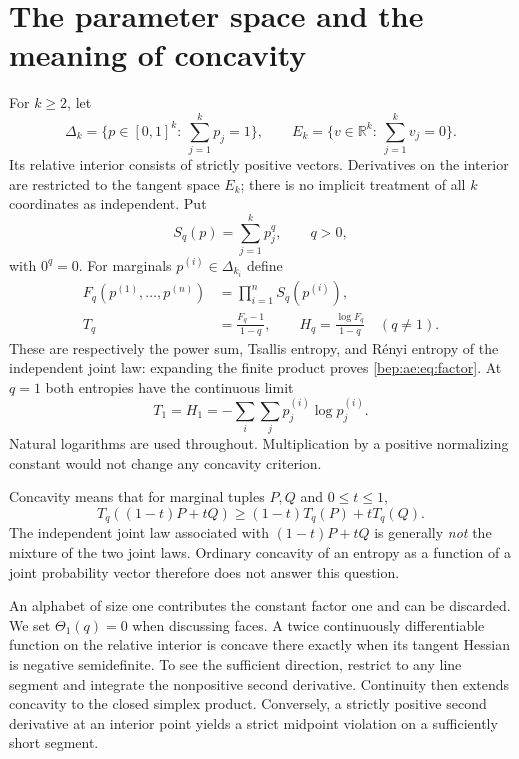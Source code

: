 \documentclass[11pt]{article}
\numberwithin{equation}{section}
\theoremstyle{definition}
\theoremstyle{remark}
\newcommand{\R}{\mathbb R}
\begin{document}
\section{The parameter space and the meaning of concavity}\label{bep:ae:sec:setup}
For $k\geq2$, let
\[
 \Delta_k=\{p\in[0,1]^k:\ \sum_{j=1}^k p_j=1\},\qquad
 E_k=\{v\in\R^k:\ \sum_{j=1}^k v_j=0\}.
\]
Its relative interior consists of strictly positive vectors. Derivatives
on the interior are restricted to the tangent space $E_k$; there is no
implicit treatment of all $k$ coordinates as independent. Put
\begin{equation}\label{bep:ae:eq:powersums}
 S_q(p)=\sum_{j=1}^k p_j^q,\qquad q>0,
\end{equation}
with $0^q=0$. For marginals $p^{(i)}\in\Delta_{k_i}$ define
\begin{align}
 F_q(p^{(1)},\ldots,p^{(n)})&=\prod_{i=1}^n S_q(p^{(i)}),\label{bep:ae:eq:factor}\\
 T_q&=\frac{F_q-1}{1-q},\qquad
 H_q=\frac{\log F_q}{1-q}\quad(q\ne1).\label{bep:ae:eq:entropies}
\end{align}
These are respectively the power sum, Tsallis entropy, and R\'enyi entropy
of the independent joint law: expanding the finite product proves
\eqref{bep:ae:eq:factor}. At $q=1$ both entropies have the continuous limit
\begin{equation}\label{bep:ae:eq:shannon}
 T_1=H_1=-\sum_i\sum_j p^{(i)}_j\log p^{(i)}_j.
\end{equation}
Natural logarithms are used throughout. Multiplication by a positive
normalizing constant would not change any concavity criterion.

Concavity means that for marginal tuples $P,Q$ and $0\leq t\leq1$,
\[
 T_q((1-t)P+tQ)\geq(1-t)T_q(P)+tT_q(Q).
\]
The independent joint law associated with $(1-t)P+tQ$ is generally
\emph{not} the mixture of the two joint laws. Ordinary concavity of an
entropy as a function of a joint probability vector therefore does not
answer this question.

An alphabet of size one contributes the constant factor one and can be
discarded. We set $\Theta_1(q)=0$ when discussing faces. A twice
continuously differentiable function on the relative interior is concave
there exactly when its tangent Hessian is negative semidefinite. To see
the sufficient direction, restrict to any line segment and integrate the
nonpositive second derivative. Continuity then extends concavity to the
closed simplex product. Conversely, a strictly positive second derivative
at an interior point yields a strict midpoint violation on a sufficiently
short segment.
\end{document}
